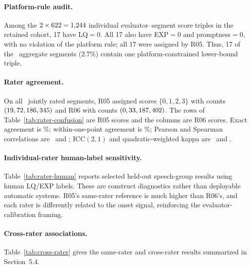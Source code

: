 \paragraph{Platform-rule audit.} Among the $2\times622=1{,}244$
individual evaluator--segment score triples in the retained cohort, 17 have
LQ$=0$. All 17 also have EXP$=0$ and promptness$=0$, with no violation of the
platform rule; all 17 were assigned by R05. Thus, 17 of the \CohortN\ aggregate
segments (2.7\%) contain one platform-constrained lower-bound triple.

\paragraph{Rater agreement.} On all \CohortN\ jointly rated segments, R05 assigned scores
$\{0,1,2,3\}$ with counts $(19,72,186,345)$ and R06 with counts
$(0,33,187,402)$. The rows of Table~\ref{tab:rater-confusion} are R05 scores
and the columns are R06 scores. Exact agreement is \InterraterExactPercent\%; within-one-point
agreement is \InterraterWithinOnePercent\%; Pearson and Spearman correlations are \InterraterPearson\ and \InterraterSpearman;
ICC$(2,1)$ and quadratic-weighted kappa are \InterraterICC\ and \InterraterKappa.



\paragraph{Individual-rater human-label sensitivity.} Table~\ref{tab:rater-human}
reports selected held-out speech-group results using human LQ/EXP labels. These
are construct diagnostics rather than deployable automatic systems. R05's
same-rater reference is much higher than R06's, and each rater is differently
related to the onset signal, reinforcing the evaluator-calibration framing.



\paragraph{Cross-rater associations.} Table~\ref{tab:cross-rater} gives the
same-rater and cross-rater results summarized in Section~5.4.

